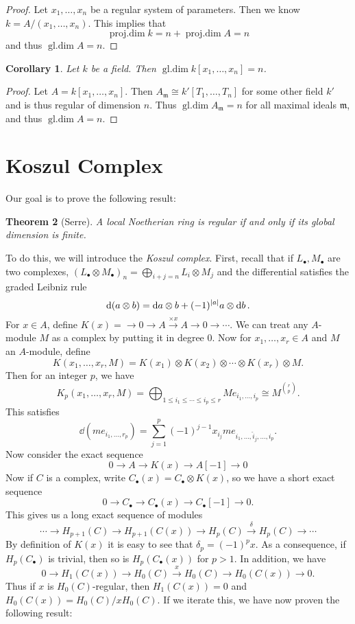 \documentclass[leqno, openany]{memoir}
\newtheorem{thm}{Theorem}[section]
\newtheorem{cor}[thm]{Corollary}
\theoremstyle{definition}
\theoremstyle{remark}
\theoremstyle{plain}
\theoremstyle{definition}
\theoremstyle{remark}
\newcommand{\mf}[1]{\mathfrak{#1}}
\newcommand{\wh}[1]{\widehat{#1}}
\DeclareMathOperator{\pdim}{proj.dim}
\DeclareMathOperator{\gdim}{gl.dim}
\begin{document}
\begin{proof}
    Let $x_1, \ldots, x_n$ be a regular system of parameters. Then we know $k = A/(x_1, \ldots, x_n)$. This implies that
    \[ \pdim k = n + \pdim A = n \]
    and thus $\gdim A = n$.
\end{proof}

\begin{cor}
    Let $k$ be a field. Then $\gdim k[x_1, \ldots, x_n] = n$.
\end{cor}

\begin{proof}
    Let $A = k[x_1, \ldots, x_n]$. Then $A_{\mf{m}} \cong k'[T_1, \ldots, T_n]$ for some other field $k'$ and is thus regular of dimension $n$. Thus $\gdim A_{\mf{m}} = n$ for all maximal ideals $\mf{m}$, and thus $\gdim A = n$.
\end{proof}

\section{Koszul Complex}%
\label{sec:koszul_complex}

Our goal is to prove the following result:
\begin{thm}[Serre]
    \label{thm:rlrgd}
A local Noetherian ring is regular if and only if its global dimension is finite.
\end{thm}

To do this, we will introduce the \textit{Koszul complex}. First, recall that if $L_{\bullet}, M_{\bullet}$ are two complexes, $(L_{\bullet} \otimes M_{\bullet})_n = \bigoplus_{i+j = n} L_i \otimes M_j$ and the differential satisfies the graded Leibniz rule
\[ \dd(a \otimes b) = \dd{a} \otimes b + (-1)^{\abs{a}} a \otimes \dd{b}. \]
For $x \in A$, define $K(x) = \to 0 \to A \xrightarrow{\times x} A \to 0 \to  \cdots$. We can treat any $A$-module $M$ as a complex by putting it in degree $0$. Now for $x_1, \ldots, x_r \in A$ and $M$ an $A$-module, define
\[ K(x_1, \ldots, x_r, M) = K(x_1) \otimes K(x_2) \otimes \cdots \otimes K(x_r) \otimes M. \]
Then for an integer $p$, we have
\[ K_p(x_1, \ldots, x_r, M) = \bigoplus_{1 \leq i_1 \leq \cdots \leq i_p \leq r} M e_{i_1, \dots, i_p} \cong M^{\binom{r}{p}}. \]
This satisfies
\[ \dd{(m e_{i_1, \ldots, r_p})} = \sum_{j=1}^p (-1)^{j-1} x_{i_j} m e_{i_1, \ldots, \wh{i}_j, \ldots, i_p}. \]
Now consider the exact sequence
\[ 0 \to A \to K(x) \to A[-1] \to 0 \]
Now if $C$ is a complex, write $C_{\bullet}(x) = C_{\bullet} \otimes K(x)$, so we have a short exact sequence
\[ 0 \to C_{\bullet} \to C_{\bullet}(x) \to C_{\bullet}[-1] \to 0. \]
This gives us a long exact sequence of modules
\[ \cdots \to H_{p+1}(C) \to H_{p+1}(C(x)) \to H_p(C) \xrightarrow{\delta} H_p(C) \to \cdots \]
By definition of $K(x)$ it is easy to see that $\delta_p = (-1)^p x$. As a consequence, if $H_p(C_{\bullet})$ is trivial, then so is $H_p(C_{\bullet}(x))$ for $p > 1$. In addition, we have
\[ 0 \to H_1(C(x)) \to H_0(C) \xrightarrow{x} H_0(C) \to H_0(C(x)) \to 0. \]
Thus if $x$ is $H_0(C)$-regular, then $H_1(C(x)) = 0$ and $H_0(C(x)) = H_0(C) / x H_0(C)$. If we iterate this, we have now proven the following result:
\end{document}
